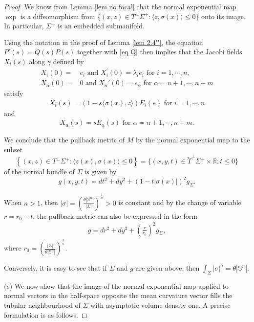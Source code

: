 \documentclass[11pt, reqno]{amsart}
\numberwithin{equation}{section}
\begin{document}
\begin{proof}
We know from Lemma \ref{lem no focal} that the normal exponential map $\exp$ is a diffeomorphism from $\{(x, z)\in T^\perp \Sigma^+: \langle z, \sigma(x)\rangle \le 0\}$ onto its image. In particular, $\Sigma^+$ is an embedded submanifold.

Using the notation in the proof of Lemma \ref{lem 2.4''}, the equation $P'(s)=Q(s)P(s)$ together with \eqref{eq Q} then implies that the Jacobi fields $X_i(s)$ along ${\gamma}$ defined by
\begin{equation*}
\begin{aligned}
X_i(0)=& e_i \text { and } X_i^{\prime}(0)=\lambda_i e_i \text{ for } i=1, \cdots, n, \\
X_\alpha(0)=& 0 \text { and } X_\alpha'(0)=e_\alpha \text{ for }\alpha=n+1, \cdots, n+m
\end{aligned}
\end{equation*}
satisfy
\begin{align*}
X_i(s)= \left(1-s\langle\sigma(x), z\rangle\right) E_i(s) \text{ for } i=1, \cdots, n
\end{align*}
and
\begin{align*}
X_\alpha(s)= s E_\alpha(s)\text{ for }\alpha=n+1, \cdots, n+m.
\end{align*}

We conclude that the pullback metric of $M$ by the normal exponential map to the subset
$$\left\{(x, z) \in T^{\perp} \Sigma^+:\langle z(x), \sigma(x)\rangle \le 0\right\}=\{(x, y, t)\in \widetilde T^\perp \Sigma^+\times \mathbb R: t\le0\}$$ of the normal bundle of $\Sigma$ is given by
\begin{equation}\label{eq g}
g(x, y, t)=d t^2+d y^2+(1-t|\sigma(x)|)^2 g_{\Sigma}.
\end{equation}

When $n>1$, then $|\sigma|=\left(\frac{\theta\left|\mathbb{S}^n\right|}{|\Sigma|}\right)^{\frac{1}{n}}>0$ is constant and by the change of variable $r=r_0-t$, the pullback metric can also be expressed in the form
\begin{align*}
g=dr^2+dy^2+\left(\frac{r}{r_0}\right)^2g_\Sigma,
\end{align*}
where $r_0=\left(\frac{|\Sigma|}{\theta|\mathbb S^n|}\right)^{\frac{1}{n}}$.

Conversely, it is easy to see that if $\Sigma$ and $g$ are given above, then $\int_\Sigma|\sigma|^n=\theta |\mathbb S^n|$.

\noindent(c)
We now show that the image of the normal exponential map applied to normal vectors in the half-space opposite the mean curvature vector fills the tubular neighbourhood of $\Sigma$ with asymptotic volume density one. A precise formulation is as follows.


\end{proof}
\end{document}
